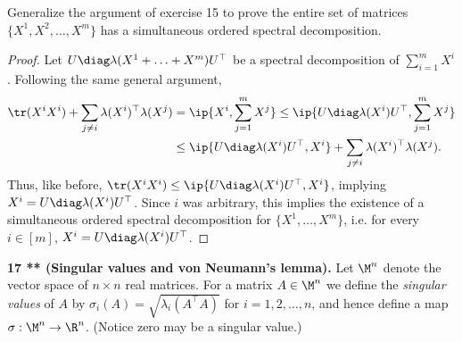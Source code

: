 \documentclass[../borwein-lewis_notes.tex]{subfiles}
\begin{document}
Generalize the argument of exercise 15 to prove the entire set of 
matrices $\{X^1,X^2,\ldots, X^m\}$ has a simultaneous ordered spectral 
decomposition. 
\begin{proof}
Let $U \diag\lambda(X^1+\ldots+X^m)U^\top$ be a spectral decomposition of 
$\sum_{i=1}^m X^i$. Following the same general argument,
\begin{align*}
\tr(X^iX^i) + \sum_{j\neq i}\lambda(X^i)^\top\lambda(X^j) &=
\ip{X^i, \sum_{j=1}^m X^j} \leq \ip{U\diag\lambda(X^i)
U^\top, \sum_{j=1}^m X^j}\\
&\leq \ip{U\diag\lambda(X^i)U^\top, X^i} + 
\sum_{j\neq i} \lambda(X^i)^\top\lambda(X^j).
\end{align*}
Thus, like before, $\tr(X^iX^i) \leq \ip{U\diag\lambda(X^i)U^\top, X^i}$, 
implying $X^i = U\diag\lambda(X^i)U^\top$. Since $i$ was arbitrary, 
this implies the existence of a simultaneous ordered spectral 
decomposition for $\{X^1,\ldots, X^m\}$, i.e. for every $i\in[m]$,
$X^i = U\diag\lambda(X^i)U^\top$.
\end{proof}
\noindent \textbf{17 ** (Singular values and von Neumann's lemma).}
Let $\M^n$ denote the vector space of $n\times n$ real matrices. For 
a matrix $A\in\M^n$ we define the \textit{singular values} of $A$ by 
$\sigma_i(A)=\sqrt{\lambda_i(A^\top A)}$ for $i=1,2,\ldots,n$, and 
hence define a map $\sigma:\M^n\to\R^n$. (Notice zero may be a singular 
value.) 
\end{document}
